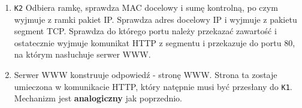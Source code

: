 \documentclass[../sk-egzamin.tex]{subfiles}
\begin{document}
\begin{enumerate}
    \item \texttt{K2} Odbiera ramkę, sprawdza MAC docelowy i sumę kontrolną,
    po czym wyjmuje z ramki pakiet IP.
    Sprawdza adres docelowy IP i wyjmuje z pakietu segment TCP.
    Sprawdza do którego portu należy przekazać zawartość 
    i ostatecznie wyjmuje komunikat HTTP z segmentu i przekazuje do portu 80,
    na którym nasłuchuje serwer WWW.

    \item Serwer WWW konstruuje odpowiedź - stronę WWW.
    Strona ta zostaje umieczona w komunikacie HTTP, który natępnie musi być
    przesłany do \texttt{K1}. Mechanizm jest \textbf{analogiczny} jak
    poprzednio.
\end{enumerate}

\pagebreak
\end{document}
